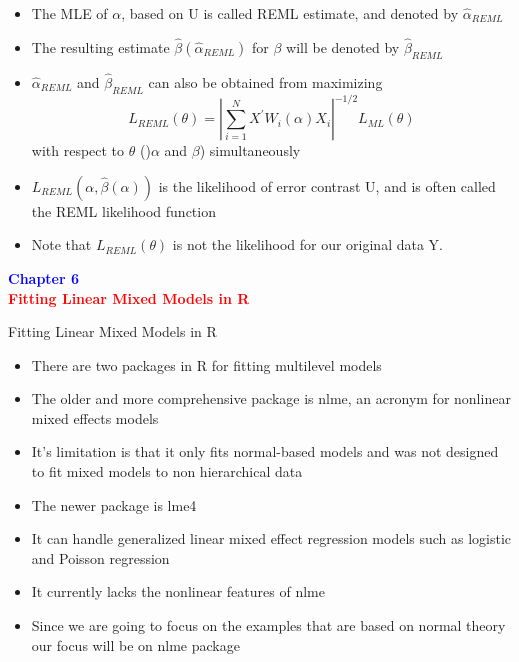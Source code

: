 \documentclass{beamer}
\begin{document}
\begin{frame}
\begin{itemize}
	\item The MLE of $\alpha$, based on U is called REML estimate, and denoted by $\hat{\alpha}_{REML}$
	\item The resulting estimate $\hat{\beta}(\hat{\alpha}_{REML})$ for $\beta$ will be denoted by $\hat{\beta}_{REML}$
	\item $\hat{\alpha}_{REML}$ and $\hat{\beta}_{REML}$ can also be obtained from maximizing 
	\[
	L_{REML}(\theta)=|\sum_{i=1}^{N}X^{'}W_i(\alpha)X_i|^{-1/2}L_{ML}(\theta)
	\] with respect to $\theta$ ()$\alpha$ and $\beta$) simultaneously
	\item $L_{REML}(\alpha,\hat{\beta}(\alpha))$ is the likelihood of error contrast U, and is often called the REML likelihood function
	\item Note that $L_{REML}(\theta)$ is not the likelihood for our original data Y.
\end{itemize}
\end{frame}


\begin{frame}
\centering
\Large
\textbf{\textcolor{blue} {Chapter 6}}\\
\vspace*{3mm}
\textbf{\textcolor{red} {Fitting Linear Mixed Models in R}}
\end{frame}

\begin{frame}{Fitting Linear Mixed Models in R}
\begin{itemize}
	\item There are two packages in R for fitting multilevel models
	\item The older and more comprehensive package is nlme, an acronym for nonlinear mixed effects models
	\item It’s limitation is that it only fits normal-based models and was not designed to fit mixed models to	non hierarchical data
	\item The newer package is lme4
	\item It can handle generalized linear mixed effect regression models such as logistic and Poisson regression
	\item It currently lacks the nonlinear features of nlme
	\item Since we are going to focus on the examples that are based on normal theory our focus will be on nlme package
\end{itemize}
\end{frame}
\end{document}
